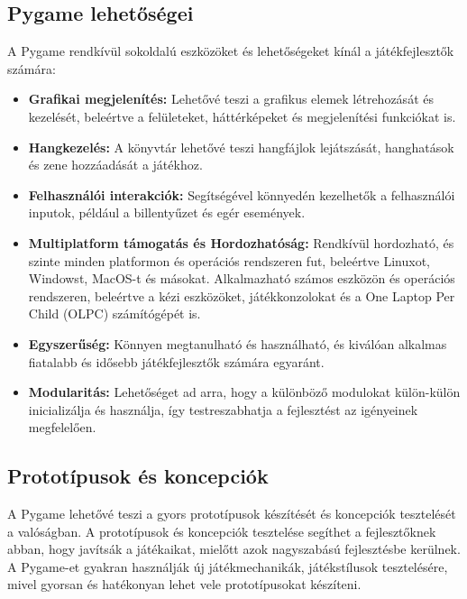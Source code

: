 \subsection{Pygame lehetőségei}
 A Pygame rendkívül sokoldalú eszközöket és lehetőségeket kínál a játékfejlesztők számára:

\begin{itemize}
    
\item    \textbf{Grafikai megjelenítés:} Lehetővé teszi a grafikus elemek létrehozását és kezelését, beleértve a felületeket, háttérképeket és megjelenítési funkciókat is.
    
\item    \textbf{Hangkezelés:} A könyvtár lehetővé teszi hangfájlok lejátszását, hanghatások és zene hozzáadását a játékhoz.
    
\item    \textbf{Felhasználói interakciók:} Segítségével könnyedén kezelhetők a felhasználói inputok, például a billentyűzet és egér események.
    
\item    \textbf{Multiplatform támogatás és Hordozhatóság:} Rendkívül hordozható, és szinte minden platformon és operációs rendszeren fut, beleértve Linuxot, Windowst, MacOS-t és másokat. Alkalmazható számos eszközön és operációs rendszeren, beleértve a kézi eszközöket, játékkonzolokat és a One Laptop Per Child (OLPC) \cite{olpc} számítógépét is.
    
\item    \textbf{Egyszerűség:} Könnyen megtanulható és használható, és kiválóan alkalmas fiatalabb és idősebb játékfejlesztők számára egyaránt.
    
\item    \textbf{Modularitás:} Lehetőséget ad arra, hogy a különböző modulokat külön-külön inicializálja és használja, így testreszabhatja a fejlesztést az igényeinek megfelelően.
\end{itemize}


\subsection{Prototípusok és koncepciók}
 A Pygame lehetővé teszi a gyors prototípusok készítését és koncepciók tesztelését a valóságban. A prototípusok és koncepciók tesztelése segíthet a fejlesztőknek abban, hogy javítsák a játékaikat, mielőtt azok nagyszabású fejlesztésbe kerülnek. A Pygame-et gyakran használják új játékmechanikák, játékstílusok tesztelésére, mivel gyorsan és hatékonyan lehet vele prototípusokat készíteni.

